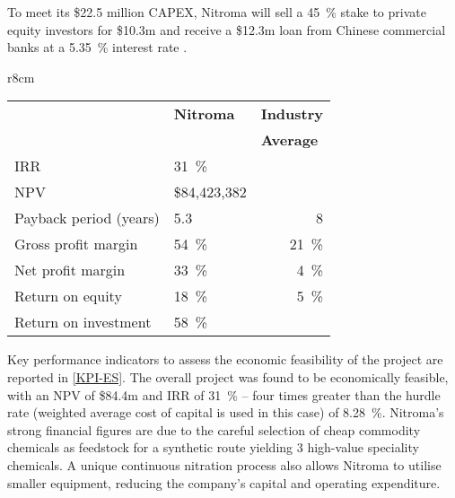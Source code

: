 To meet its \$22.5 million CAPEX, Nitroma will sell a \SI{45}{\percent} stake to private equity investors for \$10.3m and receive a \$12.3m loan from Chinese commercial banks at a \SI{5.35}{\percent} interest rate \cite{r}.

\begin{wraptable}{r}{8cm}
\centering
\caption{Nitroma's KPIs compared to the industry average (damodar,outlookmoney)}
\label{KPI-ES}
\begin{tabular}{@{}l|l|l@{}}
\toprule
           &  \multicolumn{1}{l|}{\textbf{Nitroma}} & \multicolumn{1}{c}{\textbf{Industry}} \\
                     & \multicolumn{1}{l|}{}        & \textbf{Average}                      \\ \midrule

IRR                  & \SI{31}{\percent}                         &                              \\
NPV                  & \$84,423,382                 &                              \\
Payback period (years)       & 5.3                          & \multicolumn{1}{r}{8}      \\
Gross profit margin  & \SI{54}{\percent}                         & \multicolumn{1}{r}{\SI{21}{\percent}}   \\
Net profit margin    & \SI{33}{\percent}                         & \multicolumn{1}{r}{\SI{4}{\percent}}    \\
Return on equity     & \SI{18}{\percent}                         & \multicolumn{1}{r}{\SI{5}{\percent}}   \\
Return on investment & \SI{58}{\percent}                         &                              \\ \bottomrule
\end{tabular}
\end{wraptable}

Key performance indicators to assess the economic feasibility of the project are reported in \cref{KPI-ES}. The overall project was found to be economically feasible, with an NPV of \$84.4m and IRR of \SI{31}{\percent} – four times greater than the hurdle rate (weighted average cost of capital is used in this case) of \SI{8.28}{\percent}. Nitroma’s strong financial figures are due to the careful selection of cheap commodity chemicals as feedstock for a synthetic route yielding 3 high-value speciality chemicals. A unique continuous nitration process also allows Nitroma to utilise smaller equipment, reducing the company’s capital and operating expenditure.

